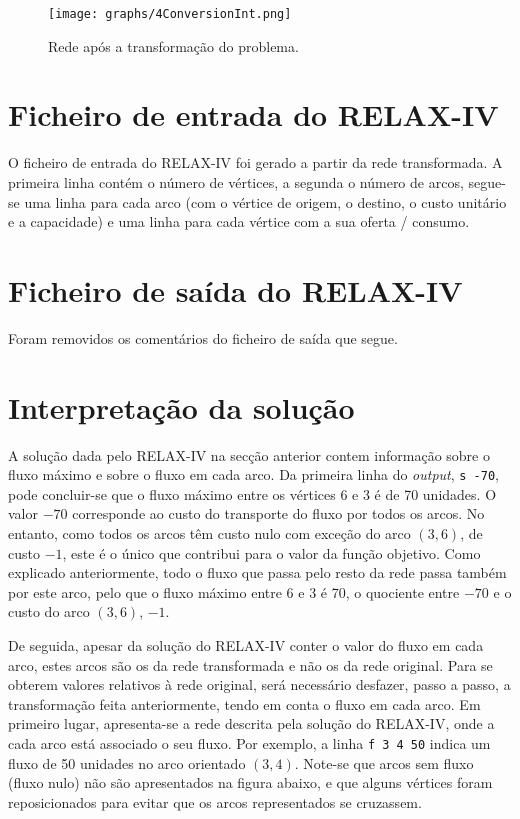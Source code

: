 \documentclass[12pt, a4paper, titlepage]{article}
\begin{document}
\begin{figure}[H]
    \centering
    \texttt{[image: graphs/4ConversionInt.png]}
    \caption{Rede após a transformação do problema.}
    \label{4conversion-graph}
\end{figure}

\section{Ficheiro de entrada do RELAX-IV}

O ficheiro de entrada do RELAX-IV foi gerado a partir da rede transformada. A primeira linha contém
o número de vértices, a segunda o número de arcos, segue-se uma linha para cada arco (com o vértice
de origem, o destino, o custo unitário e a capacidade) e uma linha para cada vértice com a sua
oferta / consumo. \\



\section{Ficheiro de saída do RELAX-IV}

Foram removidos os comentários do ficheiro de saída que segue. \\



\section{Interpretação da solução}

A solução dada pelo RELAX-IV na secção anterior contem informação sobre o fluxo máximo e sobre o
fluxo em cada arco. Da primeira linha do \emph{output}, \texttt{s -70}, pode concluir-se que o fluxo
máximo entre os vértices 6 e 3 é de 70 unidades. O valor $-70$ corresponde ao custo do transporte
do fluxo por todos os arcos. No entanto, como todos os arcos têm custo nulo com exceção do arco
$(3, 6)$, de custo $-1$, este é o único que contribui para o valor da função objetivo. Como
explicado anteriormente, todo o fluxo que passa pelo resto da rede passa também por este arco, pelo
que o fluxo máximo entre 6 e 3 é 70, o quociente entre $-70$ e o custo do arco $(3, 6)$, $-1$.

De seguida, apesar da solução do RELAX-IV conter o valor do fluxo em cada arco, estes arcos são os
da rede transformada e não os da rede original. Para se obterem valores relativos à rede original,
será necessário desfazer, passo a passo, a transformação feita anteriormente, tendo em conta o fluxo
em cada arco. Em primeiro lugar, apresenta-se a rede descrita pela solução do RELAX-IV, onde a cada
arco está associado o seu fluxo. Por exemplo, a linha \texttt{f 3 4 50} indica um fluxo de 50
unidades no arco orientado $(3, 4)$. Note-se que arcos sem fluxo (fluxo nulo) não são apresentados
na figura abaixo, e que alguns vértices foram reposicionados para evitar que os arcos representados
se cruzassem.
\end{document}
